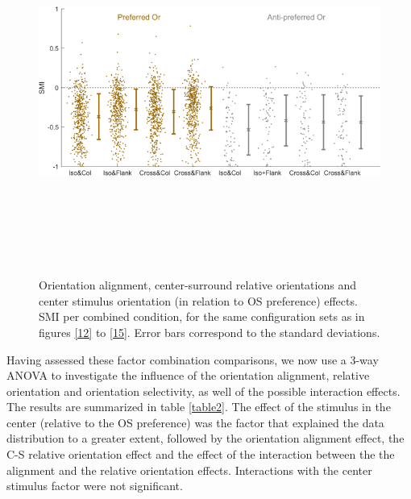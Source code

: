 \begin{figure}[H] \centering \includegraphics[width=12cm,height=12cm,keepaspectratio]{Figures/7.Results/finalPopulation/sel/popPlots_VisROIs_COS_2SalignmentAngle.png} 
\caption{Orientation alignment, center-surround relative orientations and center stimulus orientation (in relation to OS preference) effects. SMI per combined condition, for the same configuration sets as in figures \ref{12} to \ref{15}. Error bars correspond to the standard deviations.} \label{anova2}
\end{figure}

Having assessed these factor combination comparisons, we now use a 3-way ANOVA to investigate the influence of the orientation alignment, relative orientation and orientation selectivity, as well of the possible interaction effects. The results are summarized in table \ref{table2}. The effect of the stimulus in the center (relative to the OS preference) 
was the factor that explained the data distribution to a greater extent, followed by the orientation alignment effect, the C-S relative orientation effect and the effect of the interaction between the the alignment and the relative orientation effects. Interactions with the center stimulus factor were not significant.

